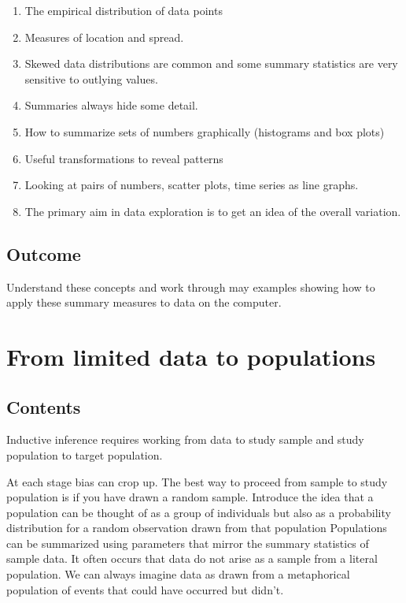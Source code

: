\documentclass[
  letterpaper,
]{scrbook}
\providecommand{\tightlist}{%
  \setlength{\itemsep}{0pt}\setlength{\parskip}{0pt}}\usepackage{longtable,booktabs,array}
\begin{document}
\begin{enumerate}
\def\labelenumi{\arabic{enumi}.}
\tightlist
\item
  The empirical distribution of data points
\item
  Measures of location and spread.
\item
  Skewed data distributions are common and some summary statistics are
  very sensitive to outlying values.
\item
  Summaries always hide some detail.
\item
  How to summarize sets of numbers graphically (histograms and box
  plots)
\item
  Useful transformations to reveal patterns
\item
  Looking at pairs of numbers, scatter plots, time series as line
  graphs.
\item
  The primary aim in data exploration is to get an idea of the overall
  variation.
\end{enumerate}

\hypertarget{outcome-1}{%
\section{Outcome}\label{outcome-1}}

Understand these concepts and work through may examples showing how to
apply these summary measures to data on the computer.


\hypertarget{from-limited-data-to-populations}{%
\chapter{From limited data to
populations}\label{from-limited-data-to-populations}}

\hypertarget{contents-2}{%
\section{Contents}\label{contents-2}}

Inductive inference requires working from data to study sample and study
population to target population.

At each stage bias can crop up. The best way to proceed from sample to
study population is if you have drawn a random sample. Introduce the
idea that a population can be thought of as a group of individuals but
also as a probability distribution for a random observation drawn from
that population Populations can be summarized using parameters that
mirror the summary statistics of sample data. It often occurs that data
do not arise as a sample from a literal population. We can always
imagine data as drawn from a metaphorical population of events that
could have occurred but didn't.
\end{document}
